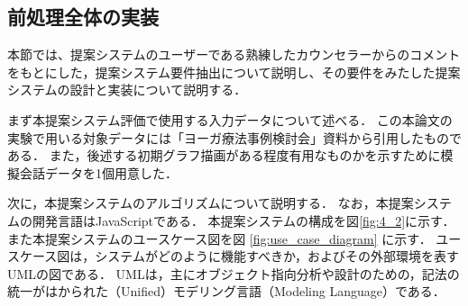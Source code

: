 \documentclass[shuuron]{kuee}
\begin{document}


\subsection{前処理全体の実装}

本節では、提案システムのユーザーである熟練したカウンセラーからのコメントをもとにした，提案システム要件抽出について説明し、その要件をみたした提案システムの設計と実装について説明する．

まず本提案システム評価で使用する入力データについて述べる．
この本論文の実験で用いる対象データには「ヨーガ療法事例検討会」資料から引用したものである．
また，後述する初期グラフ描画がある程度有用なものかを示すために模擬会話データを1個用意した．

次に，本提案システムのアルゴリズムについて説明する．
なお，本提案システムの開発言語はJavaScriptである．
本提案システムの構成を図\ref{fig:4_2}に示す．
また本提案システムのユースケース図を図
\ref{fig:use_case_diagram}
に示す．
ユースケース図は，システムがどのように機能すべきか，およびその外部環境を表すUMLの図である．
UMLは，主にオブジェクト指向分析や設計のための，記法の統一がはかられた（Unified）モデリング言語（Modeling Language）である．
\end{document}
